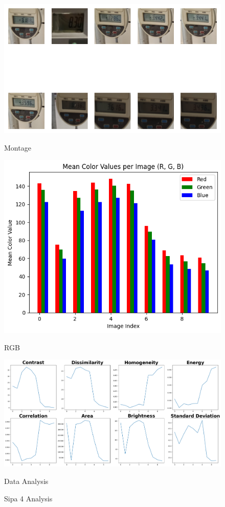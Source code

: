 \begin{figure}[ht]
    \centering
    \begin{minipage}[t]{0.25\textwidth}
        \centering
        \includegraphics[width=\textwidth]{Figures/EDA_Charts/4/montage.png}
        \caption*{Montage}
    \end{minipage}\hfill
    \begin{minipage}[t]{0.25\textwidth}
        \centering
        \includegraphics[width=\textwidth]{Figures/EDA_Charts/4/rgb.png}
        \caption*{RGB}
    \end{minipage}\hfill
    \begin{minipage}[t]{0.50\textwidth}
        \centering
        \includegraphics[width=\textwidth]{Figures/EDA_Charts/4/da.png}
        \caption*{Data Analysis}
    \end{minipage}
    \caption{Sipa 4 Analysis}
    \label{fig:Sipa 4 Analysis}
\end{figure}
